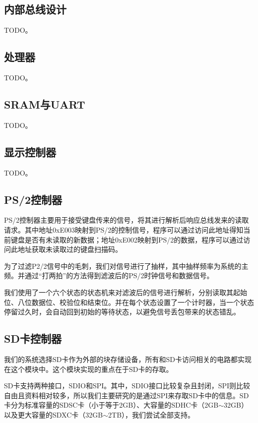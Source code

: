 \documentclass[11pt,utf8]{report}
\begin{document}
\subsection{内部总线设计}
	\par TODO。

\subsection{处理器}
	\par TODO。

\subsection{SRAM与UART}
	\par TODO。

\subsection{显示控制器}
	\par TODO。

\subsection{PS/2控制器}
	PS/2控制器主要用于接受键盘传来的信号，将其进行解析后响应总线发来的读取请求。其中地址0xE003映射到PS/2的控制信号，程序可以通过访问此地址得知当前键盘是否有未读取的新数据；地址0xE002映射到PS/2的数据，程序可以通过访问此地址获取未读取过的键盘扫描码。

	为了过滤P2/2信号中的毛刺，我们对信号进行了抽样，其中抽样频率为系统的主频。并通过“打两拍”的方法得到滤波后的PS/2时钟信号和数据信号。

	我们使用了一个六个状态的状态机来对滤波后的信号进行解析，分别读取其起始位、八位数据位、校验位和结束位。并在每个状态设置了一个计时器，当一个状态停留过久时，会自动回到初始的等待状态，以避免信号丢包带来的状态错乱。


\subsection{SD卡控制器}
	\par 我们的系统选择SD卡作为外部的块存储设备，所有和SD卡访问相关的电路都实现在这个模块中。这个模块实现的重点在于SD卡的存取。
	
	\par SD卡支持两种接口，SDIO和SPI。其中，SDIO接口比较复杂且封闭，SPI则比较自由且资料相对较多，所以我们主要研究的是通过SPI来存取SD卡中的信息。SD卡分为标准容量的SDSC卡（小于等于2GB）、大容量的SDHC卡（2GB$\sim$32GB）以及更大容量的SDXC卡（32GB$\sim$2TB），我们尝试全部支持。
	
\end{document}
